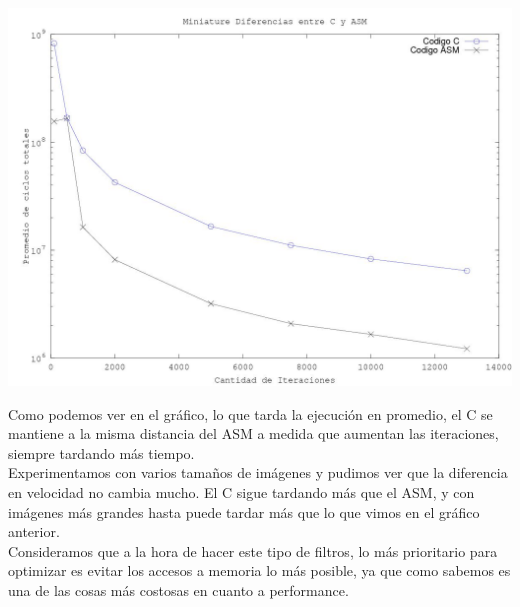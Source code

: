 \begin{center}
\includegraphics[width=16cm]{imagenes/medicionMiniature.jpg}  
\end{center}

Como podemos ver en el gr\'afico, lo que tarda la ejecuci\'on en promedio, el C se mantiene a la misma distancia del ASM a medida que aumentan las iteraciones, siempre tardando m\'as tiempo.\\

Experimentamos con varios tamaños de im\'agenes y pudimos ver que la diferencia en velocidad no cambia mucho. El C sigue tardando m\'as que el ASM, y con im\'agenes m\'as grandes hasta puede tardar m\'as que lo que vimos en el gr\'afico anterior.\\
Consideramos que a la hora de hacer este tipo de filtros, lo m\'as prioritario para optimizar es evitar los accesos a memoria lo m\'as posible, ya que como sabemos es una de las cosas m\'as costosas en cuanto a performance.\\




